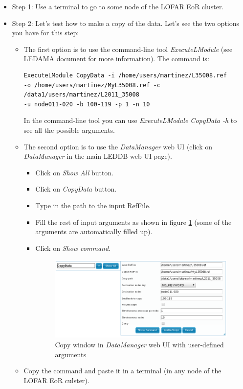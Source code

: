 \documentclass[a4paper,11pt]{article}
\begin{document}
\begin{itemize}
	\item Step 1: Use a terminal to go to some node of the LOFAR EoR cluster.

	\item Step 2: Let's test how to make a copy of the data. Let's see the two options you have for this step: 

	\begin{itemize}
		\item The first option is to use the command-line tool \textit{ExecuteLModule} (see LEDAMA document for more information). The command is:
			\begin{verbatim}
ExecuteLModule CopyData -i /home/users/martinez/L35008.ref
-o /home/users/martinez/MyL35008.ref -c /data1/users/martinez/L2011_35008
-u node011-020 -b 100-119 -p 1 -n 10
			\end{verbatim}
			In the command-line tool you can use \textit{ExecuteLModule CopyData -h} to see all the possible arguments.
		\item The second option is to use the \textit{DataManager} web UI (click on \textit{DataManager} in the main LEDDB web UI page). 
			\begin{itemize}
				\item Click on \textit{Show All} button.
	
				\item Click on \textit{CopyData} button.
	
				\item Type in the path to the input RefFile. 
	
				\item Fill the rest of input arguments as shown in figure \ref{fig:guicopy} (some of the arguments are automatically filled up). 
	
				\item Click on \textit{Show command}.
					\begin{figure}[h]
						\centering
						\includegraphics[scale=0.50]{fig/guicopy} 
						\caption{Copy window in \textit{DataManager} web UI with user-defined arguments}
						\label{fig:guicopy}
					\end{figure}
			\end{itemize} 
		\item Copy the command and paste it in a terminal (in any node of the LOFAR EoR culster).
	\end{itemize}


\end{itemize}
\end{document}
